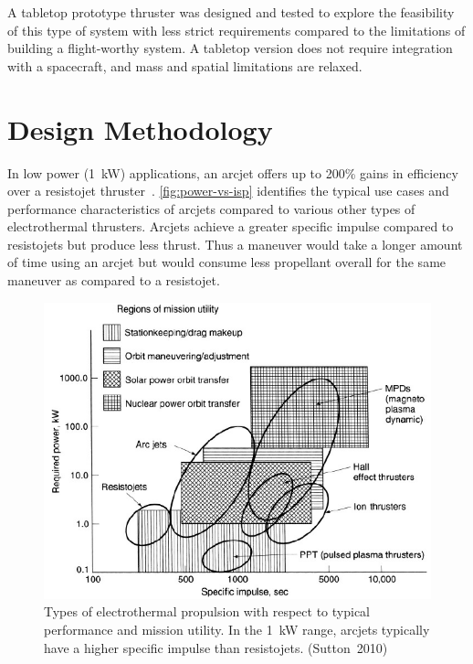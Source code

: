 \documentclass[journal]{IEEEtran}
\begin{document}
A tabletop prototype thruster was designed and tested to explore the feasibility of this type of system with less strict requirements compared to the limitations of building a flight-worthy system.
A tabletop version does not require integration with a spacecraft, and mass and spatial limitations are relaxed.

\section{Design Methodology}
\label{sec:method}
In low power (\SI{1}{\kilo\watt}) applications, an arcjet offers up to 200\% gains in efficiency over a resistojet thruster~\cite{sutton}.
\autoref{fig:power-vs-isp} identifies the typical use cases and performance characteristics of arcjets compared to various other types of electrothermal thrusters.
Arcjets achieve a greater specific impulse compared to resistojets but produce less thrust.
Thus a maneuver would take a longer amount of time using an arcjet but would consume less propellant overall for the same maneuver as compared to a resistojet.
\begin{figure}[htp]
  \centering
  \includegraphics[width=\linewidth]{figs/power-vs-isp_sutton}
  \caption[Types of electrothermal propulsion]{Types of electrothermal propulsion with respect to typical performance and mission utility.
  In the \SI{1}{\kilo\watt} range, arcjets typically have a higher specific impulse than resistojets. (Sutton~2010)
\label{fig:power-vs-isp}}
\end{figure}
\end{document}
